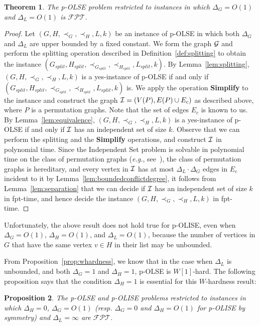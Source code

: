 \documentclass[11pt]{article}
\newtheorem{theorem}{Theorem}[section]
\newtheorem{proposition}[theorem]{Proposition}
\newcommand{\FPT}{\text{$\mathcal{FPT}$}}
\def\eg{{\em e.g.}}
\begin{document}
\begin{theorem}
\label{thm:mainboundeddegree}
The p-OLSE problem restricted to instances in which $\Delta_G=O(1)$ and $\Delta_L=O(1)$ is $\FPT$.
\end{theorem}

\begin{proof}
Let $(G, H, \prec_G, \prec_H, L, k)$ be an instance of p-OLSE in which both $\Delta_G$ and $\Delta_L$ are upper bounded by a fixed constant. We form the graph ${\cal G}$ and perform the splitting operation described in Definition~\ref{def:splitting} to obtain the instance $(G_{split}, H_{split}, \prec_{G_{split}}, \prec_{H_{split}}, L_{split}, k)$. By Lemma~\ref{lem:splitting}, $(G, H, \prec_G, \prec_H, L, k)$ is a yes-instance of p-OLSE if and only if $(G_{split}, H_{split}, \prec_{G_{split}}, \prec_{H_{split}}, L_{split}, k)$ is. We apply the operation {\bf Simplify} to the instance and construct the graph ${\cal I} = (V(P), E(P) \cup E_c)$ as described above, where $P$ is a permutation graphs. Note that the set of edges $E_c$ is known to us. By Lemma~\ref{lem:equivalence}, $(G, H, \prec_G, \prec_H, L, k)$ is a yes-instance of p-OLSE if and only if ${\cal I}$ has an independent set of size $k$. Observe that we can perform the splitting and the {\bf Simplify} operations, and construct ${\cal I}$ in polynomial time. Since the {\sc Independent Set} problem is solvable in polynomial time on the class of permutation graphs (\eg, see~\cite{kim}), the class of permutation graphs is hereditary, and every vertex in ${\cal I}$ has at most $\Delta_L \cdot \Delta_G$ edges in $E_c$ incident to it by Lemma~\ref{lem:boundedconflictdegree}, it follows from Lemma~\ref{lem:separation} that we can decide if ${\cal I}$ has an independent set of size $k$ in fpt-time, and hence decide the instance $(G, H, \prec_G, \prec_H, L, k)$ in fpt-time. \end{proof}

Unfortunately, the above result does not hold true for p-OLISE, even when $\Delta_G = O(1)$, $\Delta_H=O(1)$, and $\Delta_L = O(1)$, because the number of vertices in $G$ that have the same vertex $v \in H$ in their list may be unbounded.

From Proposition~\ref{prop:whardness}, we know that in the case when $\Delta_L$ is unbounded, and both $\Delta_G = 1$ and $\Delta_H = 1$, p-OLSE is $W[1]$-hard. The following proposition says that the condition $\Delta_H = 1$ is essential for this $W$-hardness result:

\begin{proposition}
\label{prop:randomsimple}
The p-OLSE and p-OLISE problems restricted to instances in which $\Delta_H=0$, $\Delta_G=O(1)$ (resp. $\Delta_G=0$ and $\Delta_H=O(1)$ for p-OLISE by symmetry) and $\Delta_L=\infty$ are $\FPT$.
\end{proposition}
\end{document}
